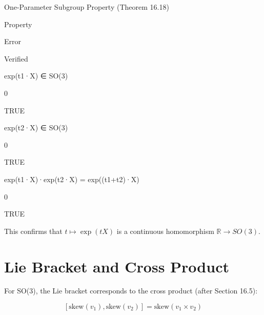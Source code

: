 \documentclass[
]{book}
\theoremstyle{definition}
\theoremstyle{definition}
\theoremstyle{definition}
\theoremstyle{definition}
\theoremstyle{remark}
\begin{document}
\label{tab:one-parameter-subgroup}One-Parameter Subgroup Property (Theorem 16.18)

Property

Error

Verified

exp(t1·X) ∈ SO(3)

0

TRUE

exp(t2·X) ∈ SO(3)

0

TRUE

exp(t1·X)·exp(t2·X) = exp((t1+t2)·X)

0

TRUE

This confirms that \(t \mapsto \exp(tX)\) is a continuous homomorphism \(\mathbb{R} \to SO(3)\).

\section{Lie Bracket and Cross Product}\label{lie-bracket-and-cross-product}

For SO(3), the Lie bracket corresponds to the cross product (after Section 16.5):

\[[\text{skew}(v_1), \text{skew}(v_2)] = \text{skew}(v_1 \times v_2)\]
\end{document}

